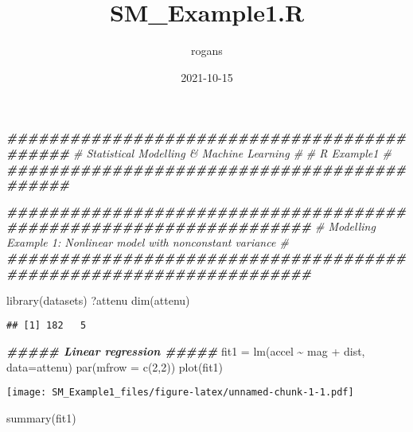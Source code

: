 \documentclass[
]{article}
\title{SM\_Example1.R}
\author{rogans}
\date{2021-10-15}
\newenvironment{Shaded}{\begin{snugshade}}{\end{snugshade}}
\newcommand{\AttributeTok}[1]{\textcolor[rgb]{0.77,0.63,0.00}{#1}}
\newcommand{\CommentTok}[1]{\textcolor[rgb]{0.56,0.35,0.01}{\textit{#1}}}
\newcommand{\DecValTok}[1]{\textcolor[rgb]{0.00,0.00,0.81}{#1}}
\newcommand{\DocumentationTok}[1]{\textcolor[rgb]{0.56,0.35,0.01}{\textbf{\textit{#1}}}}
\newcommand{\FunctionTok}[1]{\textcolor[rgb]{0.00,0.00,0.00}{#1}}
\newcommand{\NormalTok}[1]{#1}
\newcommand{\OtherTok}[1]{\textcolor[rgb]{0.56,0.35,0.01}{#1}}
\newcommand{\SpecialCharTok}[1]{\textcolor[rgb]{0.00,0.00,0.00}{#1}}
\begin{document}
\maketitle

\begin{Shaded}
\begin{Highlighting}[]
\DocumentationTok{\#\#\#\#\#\#\#\#\#\#\#\#\#\#\#\#\#\#\#\#\#\#\#\#\#\#\#\#\#\#\#\#\#\#\#\#\#\#\#\#\#\#\#\#}
\CommentTok{\# Statistical Modelling \& Machine Learning \#}
\CommentTok{\#               R Example1                 \#}
\DocumentationTok{\#\#\#\#\#\#\#\#\#\#\#\#\#\#\#\#\#\#\#\#\#\#\#\#\#\#\#\#\#\#\#\#\#\#\#\#\#\#\#\#\#\#\#\#}

\DocumentationTok{\#\#\#\#\#\#\#\#\#\#\#\#\#\#\#\#\#\#\#\#\#\#\#\#\#\#\#\#\#\#\#\#\#\#\#\#\#\#\#\#\#\#\#\#\#\#\#\#\#\#\#\#\#\#\#\#\#\#\#\#\#\#\#\#\#\#\#}
\CommentTok{\# Modelling Example 1:  Nonlinear model with nonconstant variance \#}
\DocumentationTok{\#\#\#\#\#\#\#\#\#\#\#\#\#\#\#\#\#\#\#\#\#\#\#\#\#\#\#\#\#\#\#\#\#\#\#\#\#\#\#\#\#\#\#\#\#\#\#\#\#\#\#\#\#\#\#\#\#\#\#\#\#\#\#\#\#\#\#}

\FunctionTok{library}\NormalTok{(datasets)}
\NormalTok{?attenu}
\FunctionTok{dim}\NormalTok{(attenu)}
\end{Highlighting}
\end{Shaded}

\begin{verbatim}
## [1] 182   5
\end{verbatim}

\begin{Shaded}
\begin{Highlighting}[]
\DocumentationTok{\#\#\#\#\# Linear regression \#\#\#\#\#}
\NormalTok{fit1 }\OtherTok{=} \FunctionTok{lm}\NormalTok{(accel }\SpecialCharTok{\textasciitilde{}}\NormalTok{ mag }\SpecialCharTok{+}\NormalTok{ dist, }\AttributeTok{data=}\NormalTok{attenu)}
\FunctionTok{par}\NormalTok{(}\AttributeTok{mfrow =} \FunctionTok{c}\NormalTok{(}\DecValTok{2}\NormalTok{,}\DecValTok{2}\NormalTok{))}
\FunctionTok{plot}\NormalTok{(fit1)}
\end{Highlighting}
\end{Shaded}

\texttt{[image: SM\_Example1\_files/figure-latex/unnamed-chunk-1-1.pdf]}

\begin{Shaded}
\begin{Highlighting}[]
\FunctionTok{summary}\NormalTok{(fit1)}
\end{Highlighting}
\end{Shaded}
\end{document}
